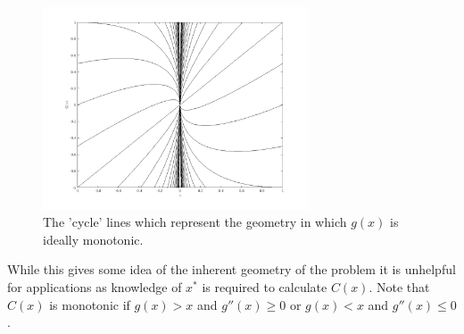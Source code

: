 \documentclass{book}
\begin{document}
\begin{figure}
\centering
\includegraphics[width=0.7\textwidth]{clines.png}
\caption{The 'cycle' lines which represent the geometry in which $g(x)$ is ideally monotonic.}
\label{fig:Clines}
\end{figure}

While this gives some idea of the inherent geometry of the problem it is unhelpful for applications as knowledge of $x^*$ is required to calculate $C(x)$.
Note that $C(x)$ is monotonic if $g(x) > x$ and $g''(x) \geq 0$ or $g(x) < x$ and $g''(x) \leq 0$.
\end{document}
